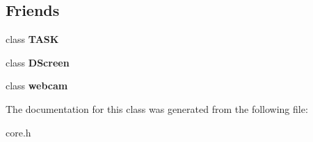 \subsection*{Friends}
\begin{DoxyCompactItemize}
\item 
\mbox{\label{class_mywebcam_1_1_picture_ab03c30e23d0961f5cb58dd75322dff41}} 
class {\bfseries T\+A\+SK}
\item 
\mbox{\label{class_mywebcam_1_1_picture_aad43f5e9d5fed3bde57927cae090a983}} 
class {\bfseries D\+Screen}
\item 
\mbox{\label{class_mywebcam_1_1_picture_a5af164fd7ee8b5b93f409d7c91b993bc}} 
class {\bfseries webcam}
\end{DoxyCompactItemize}


The documentation for this class was generated from the following file\+:\begin{DoxyCompactItemize}
\item 
core.\+h\end{DoxyCompactItemize}
